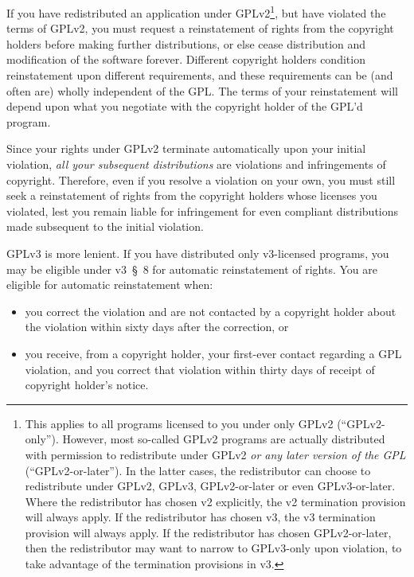 \documentclass[letterpaper]{fixme}
\begin{document}
If you have redistributed an application under GPLv2\footnote{This applies
  to all programs licensed to you under only GPLv2 (``GPLv2-only'').
  However, most so-called GPLv2 programs are actually distributed with
  permission to redistribute under GPLv2 \emph{or any later version of the
    GPL} (``GPLv2-or-later'').  In the latter cases, the redistributor can
  choose to redistribute under GPLv2, GPLv3, GPLv2-or-later or even
  GPLv3-or-later.  Where the redistributor has chosen v2 explicitly, the
  v2 termination provision will always apply.  If the redistributor has
  chosen v3, the v3 termination provision will always apply.  If the
  redistributor has chosen GPLv2-or-later, then the redistributor may want
  to narrow to GPLv3-only upon violation, to take advantage of the
  termination provisions in v3.}, but have violated the terms of GPLv2,
you must request a reinstatement of rights from the copyright holders
before making further distributions, or else cease distribution and
modification of the software forever.  Different copyright holders
condition reinstatement upon different requirements, and these
requirements can be (and often are) wholly independent of the GPL\@.  The
terms of your reinstatement will depend upon what you negotiate with the
copyright holder of the GPL'd program.

Since your rights under GPLv2 terminate automatically upon your initial
violation, \emph{all your subsequent distributions} are violations and
infringements of copyright.  Therefore, even if you resolve a violation on
your own, you must still seek a reinstatement of rights from the copyright
holders whose licenses you violated, lest you remain liable for
infringement for even compliant distributions made subsequent to the
initial violation.

GPLv3 is more lenient.  If you have distributed only v3-licensed programs,
you may be eligible under v3~\S~8 for automatic reinstatement of rights.
You are eligible for automatic reinstatement when:
\begin{itemize}
\item you correct the violation and are not contacted by a copyright
  holder about the violation within sixty days after the correction, or

\item you receive, from a copyright holder, your first-ever contact
  regarding a GPL violation, and you correct that violation within thirty
  days of receipt of copyright holder's notice.
\end{itemize}
\end{document}
